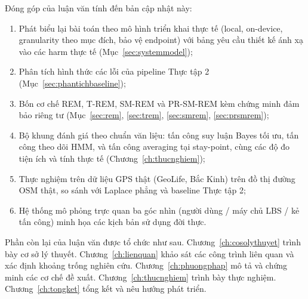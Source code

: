Đóng góp của luận văn tính đến bản cập nhật này:
\begin{enumerate}
  \item Phát biểu lại bài toán theo mô hình triển khai thực tế (local, on-device,
  granularity theo mục đích, bảo vệ endpoint) với bảng yêu cầu thiết kế ánh xạ
  vào các harm thực tế (Mục~\ref{sec:systemmodel});
  \item Phân tích hình thức các lỗi của pipeline Thực tập 2
  (Mục~\ref{sec:phantichbaseline});
  \item Bốn cơ chế REM, T-REM, SM-REM và PR-SM-REM kèm chứng minh đảm bảo riêng
  tư (Mục~\ref{sec:rem}, \ref{sec:trem}, \ref{sec:smrem}, \ref{sec:prsmrem});
  \item Bộ khung đánh giá theo chuẩn văn liệu: tấn công suy luận Bayes tối ưu,
  tấn công theo dõi HMM, và tấn công averaging tại stay-point, cùng các độ đo
  tiện ích và tính thực tế (Chương~\ref{ch:thucnghiem});
  \item Thực nghiệm trên dữ liệu GPS thật (GeoLife, Bắc Kinh) trên đồ thị đường
  OSM thật, so sánh với Laplace phẳng và baseline Thực tập 2;
  \item Hệ thống mô phỏng trực quan ba góc nhìn (người dùng / máy chủ LBS / kẻ
  tấn công) minh họa các kịch bản sử dụng đời thực.
\end{enumerate}

Phần còn lại của luận văn được tổ chức như sau. Chương~\ref{ch:cosolythuyet}
trình bày cơ sở lý thuyết. Chương~\ref{ch:lienquan} khảo sát các công trình liên
quan và xác định khoảng trống nghiên cứu. Chương~\ref{ch:phuongphap} mô tả và
chứng minh các cơ chế đề xuất. Chương~\ref{ch:thucnghiem} trình bày thực nghiệm.
Chương~\ref{ch:tongket} tổng kết và nêu hướng phát triển.
